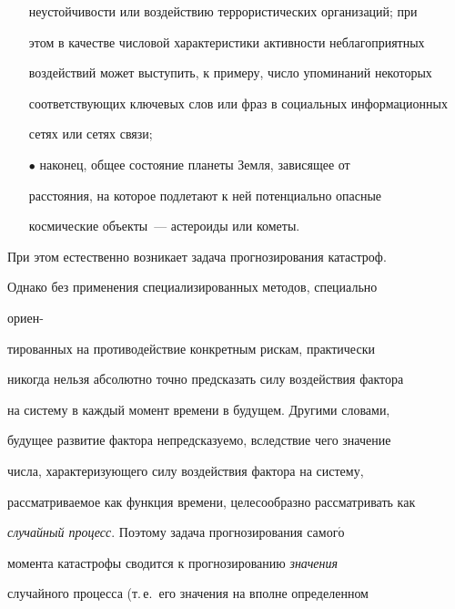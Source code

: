 \begin{multicols}{2}
\begin{itemize}
неустойчивости или воздействию терро\-ристических организаций; при


этом в качестве числовой характеристики активности неблагоприятных


воздействий может выступить, к примеру, число упоминаний некоторых


соответствующих ключевых слов или фраз в социальных информационных


сетях или сетях \mbox{связи};


\item[$\bullet$] наконец, общее состояние планеты Земля, зависящее от


расстояния, на которое подлетают к ней потенциально опасные


космические объекты~--- астероиды или кометы.


\end{itemize}





При этом естественно возникает задача прогнозирования катастроф.


Однако без применения специализированных методов, специально


ориен-\linebreak\vspace*{-12pt}





\pagebreak





\noindent


тированных на противодействие конкретным рискам, практически


никогда нельзя абсолютно точно предсказать силу воздействия фактора


на систему в каждый момент времени в будущем. Другими словами,


будущее развитие фактора непредсказуемо, вследствие чего значение


числа, характеризующего силу воздействия фактора на систему,


рас\-смат\-ри\-ва\-емое как функция времени, целесообразно рассматривать как


\textit{случайный процесс}. Поэтому задача прогнозирования самог$\acute{\mbox{о}}$


момента катастрофы сводится к прогнозированию \textit{значения}


случайного процесса (т.\,е.\ его значения на вполне определенном



\end{multicols}
